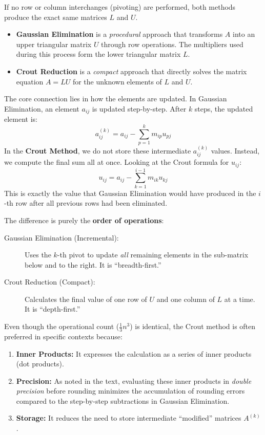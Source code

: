 \documentclass[../main.tex]{subfiles}
\begin{document}
If no row or column interchanges (pivoting) are performed, both methods produce the exact same matrices $L$ and $U$.
\begin{itemize}
	\item \textbf{Gaussian Elimination} is a \textit{procedural} approach that transforms $A$ into an upper triangular matrix $U$ through row operations. The multipliers used during this process form the lower triangular matrix $L$.
	\item \textbf{Crout Reduction} is a \textit{compact} approach that directly solves the matrix equation $A = LU$ for the unknown elements of $L$ and $U$.
\end{itemize}

The core connection lies in how the elements are updated. In Gaussian Elimination, an element $a_{ij}$ is updated step-by-step. After $k$ steps, the updated element is:
\begin{equation*}
	a_{ij}^{(k)} = a_{ij} - \sum_{p=1}^{k} m_{ip} u_{pj}
\end{equation*}
In the \textbf{Crout Method}, we do not store these intermediate $a_{ij}^{(k)}$ values. Instead, we compute the final sum all at once. Looking at the Crout formula for $u_{ij}$:
\begin{equation*}
	u_{ij} = a_{ij} - \sum_{k=1}^{i-1} m_{ik} u_{kj}
\end{equation*}
This is exactly the value that Gaussian Elimination would have produced in the $i$-th row after all previous rows had been eliminated.

The difference is purely the \textbf{order of operations}:
\begin{description}
	\item[Gaussian Elimination (Incremental):] Uses the $k$-th pivot to update \textit{all} remaining elements in the sub-matrix below and to the right. It is ``breadth-first.''
	\item[Crout Reduction (Compact):] Calculates the final value of one row of $U$ and one column of $L$ at a time. It is ``depth-first.''
\end{description}

Even though the operational count ($\frac{1}{3}n^3$) is identical, the Crout method is often preferred in specific contexts because:
\begin{enumerate}
	\item \textbf{Inner Products:} It expresses the calculation as a series of inner products (dot products).
	\item \textbf{Precision:} As noted in the text, evaluating these inner products in \textit{double precision} before rounding minimizes the accumulation of rounding errors compared to the step-by-step subtractions in Gaussian Elimination.
	\item \textbf{Storage:} It reduces the need to store intermediate ``modified'' matrices $A^{(k)}$.
\end{enumerate}
\end{document}
